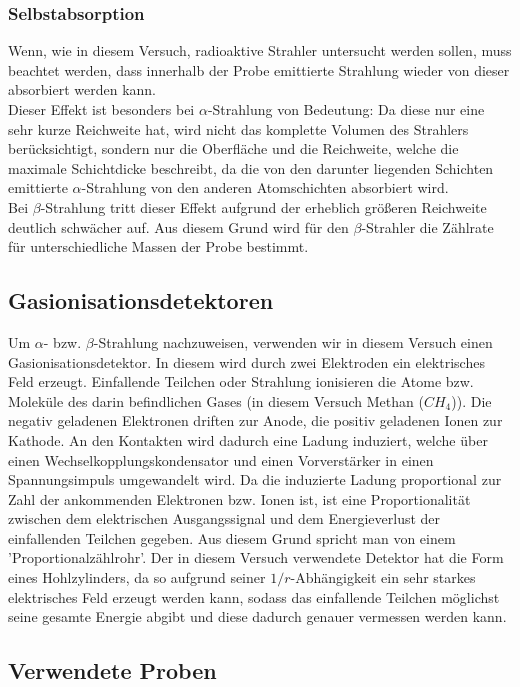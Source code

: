\subsubsection{Selbstabsorption}
Wenn, wie in diesem Versuch, radioaktive Strahler untersucht werden sollen, muss beachtet werden, dass innerhalb der Probe emittierte Strahlung wieder von dieser absorbiert werden kann. \\
Dieser Effekt ist besonders bei $\alpha$-Strahlung von Bedeutung: Da diese nur eine sehr kurze Reichweite hat, wird nicht das komplette Volumen des Strahlers berücksichtigt, sondern nur die Oberfläche und die Reichweite, welche die maximale Schichtdicke beschreibt, da die von den darunter liegenden Schichten emittierte $\alpha$-Strahlung von den anderen Atomschichten absorbiert wird.\\
Bei $\beta$-Strahlung tritt dieser Effekt aufgrund der erheblich größeren Reichweite deutlich schwächer auf. Aus diesem Grund wird für den $\beta$-Strahler die Zählrate für unterschiedliche Massen der Probe bestimmt.
\subsection{Gasionisationsdetektoren}
Um $\alpha$- bzw. $\beta$-Strahlung nachzuweisen, verwenden wir in diesem Versuch einen Gasionisationsdetektor. In diesem wird durch zwei Elektroden ein elektrisches Feld erzeugt. Einfallende Teilchen oder Strahlung ionisieren die Atome bzw. Moleküle des darin befindlichen Gases (in diesem Versuch Methan ($CH_{4}$)). Die negativ geladenen Elektronen driften zur Anode, die positiv geladenen Ionen zur Kathode. An den Kontakten wird dadurch eine Ladung induziert, welche über einen Wechselkopplungskondensator und einen Vorverstärker in einen Spannungsimpuls umgewandelt wird. Da die induzierte Ladung proportional zur Zahl der ankommenden Elektronen bzw. Ionen ist, ist eine Proportionalität zwischen dem elektrischen Ausgangssignal und dem Energieverlust der einfallenden Teilchen gegeben. Aus diesem Grund spricht man von einem 'Proportionalzählrohr'. Der in diesem Versuch verwendete Detektor hat die Form eines Hohlzylinders, da so aufgrund seiner $1/r$-Abhängigkeit ein sehr starkes elektrisches Feld erzeugt werden kann, sodass das einfallende Teilchen möglichst seine gesamte Energie abgibt und diese dadurch genauer vermessen werden kann.\\
\clearpage
\subsection{Verwendete Proben}
